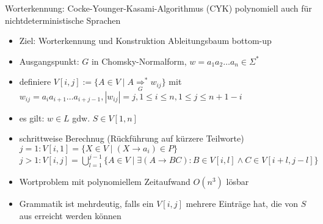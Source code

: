 
\begin{frame}{Worterkennung: Cocke-Younger-Kasami-Algorithmus (CYK)}
	polynomiell auch für nichtdeterministische Sprachen
	\begin{itemize}
		\item Ziel: Worterkennung und Konstruktion Ableitungsbaum bottom-up
		\item Ausgangspunkt: $G$ in Chomsky-Normalform, $w=a_1a_2 \ldots a_n \in \Sigma^*$
		\item definiere $V[i,j]:=\{A \in V \mid A \underset{G}{\Rightarrow}^* w_{ij} \}$ mit\\
		$w_{ij}=a_ia_{i+1}\ldots a_{i+j-1}, |w_{ij}|=j, 1\leq i \leq n, 1\leq j \leq n+1-i$
		\item es gilt: $w\in L$ gdw. $S \in V[1,n]$
		\item schrittweise Berechnug (Rückführung auf kürzere Teilworte)\\
		$j=1: V[i,1]=\{X \in V \mid (X\rightarrow a_i) \in P\}$\\
		$j>1: V[i,j]=\bigcup_{l=1}^{j-1}\{A\in V\mid \exists (A\rightarrow BC): B \in V[i,l] \land C \in V[i+l, j-l] \}$
		\item Wortproblem mit polynomiellem Zeitaufwand $O(n^3)$ lösbar
		\item Grammatik ist mehrdeutig, falls ein $V[i,j]$ mehrere Einträge hat, die von $S$ aus erreicht werden können
	\end{itemize}
\end{frame}

